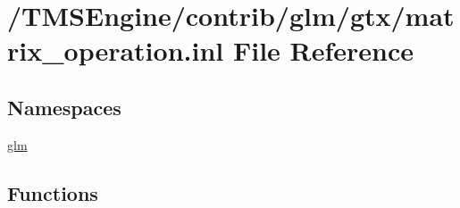 \hypertarget{matrix__operation_8inl}{}\section{/\+T\+M\+S\+Engine/contrib/glm/gtx/matrix\+\_\+operation.inl File Reference}
\label{matrix__operation_8inl}
\subsection*{Namespaces}
\begin{DoxyCompactItemize}
\item 
 \hyperlink{namespaceglm}{glm}
\end{DoxyCompactItemize}
\subsection*{Functions}
